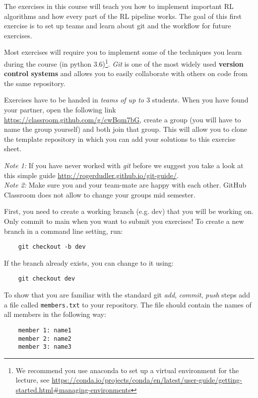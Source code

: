 \documentclass{exam}
\begin{document}
\noindent
The exercises in this course will teach you how to implement important RL algorithms and how every part of the RL pipeline works. The goal of this first exercise is to set up teams and learn about git and the workflow for future exercises.

\begin{questions}
	Most exercises will require you to implement some of the techniques you learn during the course (in python 3.6)\footnote{We recommend you use anaconda to set up a virtual environment for the lecture, see \url{https://conda.io/projects/conda/en/latest/user-guide/getting-started.html\#managing-environments}}.
	\emph{Git} is one of the most widely used \textbf{version control systems} and allows you to easily collaborate with others on code from the same repository.
	
    Exercises have to be handed in \emph{teams of up to $3$} students.
    When you have found your partner, open the following link \url{https://classroom.github.com/g/cwBqm7bG}, create a group (you will have to name the group yourself) and both join that group.
    This will allow you to clone the template repository in which you can add your solutions to this exercise sheet.

    \emph{Note 1:} If you have never worked with \emph{git} before we suggest you take a look at this simple guide \url{http://rogerdudler.github.io/git-guide/}.\\
    \emph{Note 2:} Make sure you and your team-mate are happy with each other. GitHub Classroom does not allow to change your groups mid semester. 
    
	
    First, you need to create a working branch (e.g. dev) that you will be working on. Only commit to main when you want to submit you exercises!
    To create a new branch in a command line setting, run:
    \begin{verbatim}
	git checkout -b dev
	\end{verbatim}
	If the branch already exists, you can change to it using:
	\begin{verbatim}
	git checkout dev
	\end{verbatim}
	To show that you are familiar with the standard git \emph{add}, \emph{commit}, \emph{push} steps add a file called \texttt{members.txt} to your repository.
	The file should contain the names of all members in the following way:
	\begin{verbatim}
	member 1: name1
	member 2: name2
	member 3: name3
	\end{verbatim}
	

\end{questions}
\end{document}
